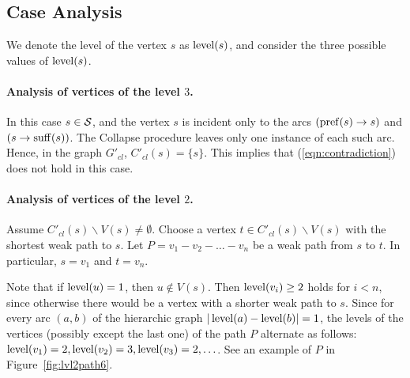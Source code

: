 \subsection{Case Analysis}
\label{sec:proof2}
We denote the level of the vertex $ s $ as $ \operatorname{level} (s) $, and consider the three possible values of $\operatorname{level}(s)$.


\paragraph{Analysis of vertices of the level \texorpdfstring{$3$}{3}.}

In this case $ s \in {\cal S} $, and the vertex $ s $ is incident only to the arcs $ (\operatorname{pref} (s) \to s)$ and $(s \to \operatorname{suff} (s)) $. The Collapse procedure leaves only one instance of each such arc. Hence, in the graph $ G'_{cl} $, $ C'_{cl} (s) = \{s \} $. This implies that (\ref{eqn:contradiction}) does not hold in this case.

\paragraph{Analysis of vertices of the level \texorpdfstring{$2$}{2}.}

Assume $ C'_{cl} (s) \backslash V (s) \ne\emptyset$. Choose a vertex $ t\in C'_{cl} (s) \backslash V (s)$ with the shortest weak path to $s$. Let $P = v_1 - v_2 - \ldots - v_n $ be a weak path from $s$ to $t$. In particular, $s=v_1$ and $t=v_n$.

Note that if $ \operatorname{level} (u) = 1 $, then $ u \notin V (s) $. Then $ \operatorname{level} (v_i) \ge 2 $ holds for $ i<n $, since otherwise there would be a vertex with a shorter weak path to $s$. Since for every arc $(a,b)$ of the hierarchic graph $ | \operatorname{level} (a) - \operatorname{level} (b) | = 1 $,  the levels of the vertices (possibly except the last one) of the path $P$ alternate as follows: $ \operatorname{level} (v_1) = 2, \operatorname{level} (v_2) = 3, \operatorname{level} (v_3) = 2,\ldots$. See an example of $P$ in Figure~\ref{fig:lvl2path6}.

